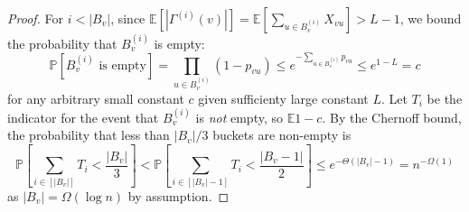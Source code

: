 \EmptyBucket*
\begin{proof}
For $i < |B_v|$, since $ \mathbb{E} \left[ |\Gamma^{(i)}(v)| \right] =\mathbb{E} \left[ \sum_{u\in B_v^{(i)}} X_{vu} \right] > L-1$, we bound the probability that $B_v^{(i)}$ is empty:
\[
\mathbb P[B_v^{(i)}\textrm{ is empty}] = \prod_{u\in B_v^{(i)}} (1-p_{vu}) \leq e^{-\sum_{u\in B_v^{(i)}} p_{vu}} \leq e^{1-L}=c
\]
for any arbitrary small constant $c$ given sufficienty large constant $L$. Let $T_{i}$ be the indicator for the event that $B_v^{(i)}$ is \emph{not} empty, so $\mathbb E 1-c$. By the Chernoff bound, the probability that less than $|B_v|/3$ buckets are non-empty is 
\[
\textstyle
\mathbb P\left[\sum_{i\in[|B_v|]} T_i<\frac{|B_v|}{3}\right]<\mathbb P\left[\sum_{i\in[|B_v|-1]} T_i<\frac{|B_v-1|}{2}\right]\leq e^{-\Theta(|B_v|-1)} = n^{-\Omega(1)}
\] as $|B_v| = \Omega(\log n)$ by assumption.
\end{proof}
